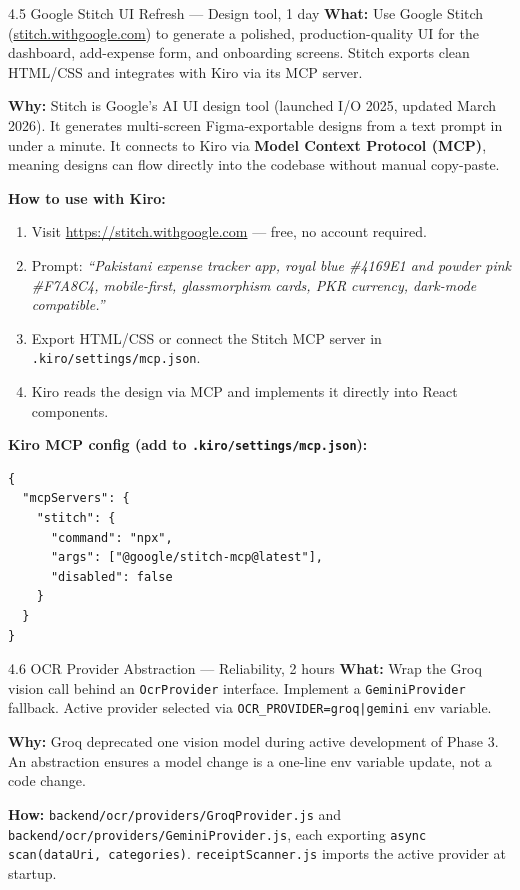 \documentclass[11pt,a4paper]{article}
\begin{document}
\begin{featurebox}{4.5 \quad Google Stitch UI Refresh \textnormal{\small — Design tool, 1 day}}
\textbf{What:} Use Google Stitch (\href{https://stitch.withgoogle.com}{stitch.withgoogle.com})
to generate a polished, production-quality UI for the dashboard, add-expense
form, and onboarding screens. Stitch exports clean HTML/CSS and integrates
with Kiro via its MCP server.

\textbf{Why:} Stitch is Google's AI UI design tool (launched I/O 2025, updated
March 2026). It generates multi-screen Figma-exportable designs from a text
prompt in under a minute.
It connects to Kiro via \textbf{Model Context Protocol (MCP)}, meaning designs
can flow directly into the codebase without manual copy-paste.

\textbf{How to use with Kiro:}
\begin{enumerate}[leftmargin=1cm, topsep=2pt]
  \item Visit \url{https://stitch.withgoogle.com} — free, no account required.
  \item Prompt: \emph{``Pakistani expense tracker app, royal blue \#4169E1 and
        powder pink \#F7A8C4, mobile-first, glassmorphism cards, PKR currency,
        dark-mode compatible.''}
  \item Export HTML/CSS or connect the Stitch MCP server in
        \texttt{.kiro/settings/mcp.json}.
  \item Kiro reads the design via MCP and implements it directly into React components.
\end{enumerate}

\textbf{Kiro MCP config (add to \texttt{.kiro/settings/mcp.json}):}
\begin{verbatim}
{
  "mcpServers": {
    "stitch": {
      "command": "npx",
      "args": ["@google/stitch-mcp@latest"],
      "disabled": false
    }
  }
}
\end{verbatim}
\end{featurebox}

\vspace{6pt}

\begin{featurebox}{4.6 \quad OCR Provider Abstraction \textnormal{\small — Reliability, 2 hours}}
\textbf{What:} Wrap the Groq vision call behind an \texttt{OcrProvider}
interface. Implement a \texttt{GeminiProvider} fallback.
Active provider selected via \texttt{OCR\_PROVIDER=groq|gemini} env variable.

\textbf{Why:} Groq deprecated one vision model during active development of
Phase 3. An abstraction ensures a model change is a one-line env variable
update, not a code change.

\textbf{How:}
\texttt{backend/ocr/providers/GroqProvider.js} and
\texttt{backend/ocr/providers/GeminiProvider.js},
each exporting \texttt{async scan(dataUri, categories)}.
\texttt{receiptScanner.js} imports the active provider at startup.
\end{featurebox}
\end{document}
